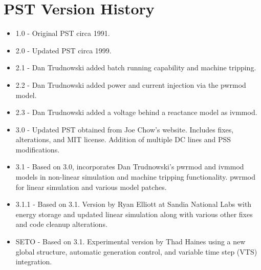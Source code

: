 \chapter{PST Version History}



\begin{itemize}
 em
\singlespacing
\item 1.0 - Original PST circa 1991.
\item 2.0 - Updated PST circa 1999.
\item 2.1 - Dan Trudnowski added batch running capability and machine tripping.
\item 2.2 - Dan Trudnowski added power and current injection via the pwrmod model.
\item 2.3 - Dan Trudnowski added a voltage behind a reactance model as ivmmod.
\item 3.0 - Updated PST obtained from Joe Chow's website. 
Includes fixes, alterations, and MIT license.
Addition of multiple DC lines and PSS modifications.
\item 3.1 - Based on 3.0, incorporates Dan Trudnowski's pwrmod and ivmmod models in non-linear simulation and machine tripping functionality.
pwrmod for linear simulation and various model patches. 
\item 3.1.1 - Based on 3.1. Version by Ryan Elliott at Sandia National Labs with energy storage and updated linear simulation along with various other fixes and code cleanup alterations. 
\item SETO - Based on 3.1. Experimental version by Thad Haines using a new global structure, automatic generation control, and variable time step (VTS) integration. 



\end{itemize}

